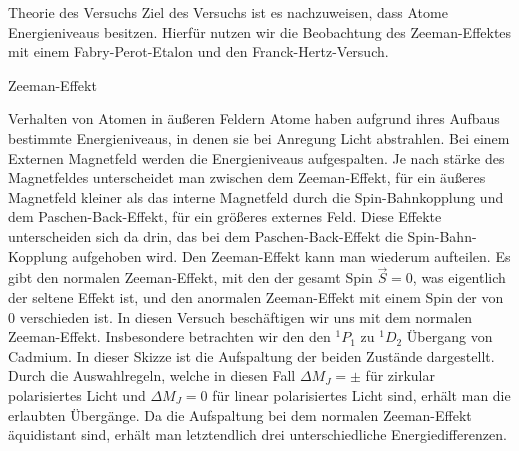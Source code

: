 \documentclass[pdftex, a4paper,11pt, twoside, ngerman]{report}
\begin{document}
  
  
  
  
  
  
  
  
  \tableofcontents
  
  
  
  \begin{chapter}{Theorie des Versuchs}
    \label{chp:Theorie}
    Ziel des Versuchs ist es nachzuweisen, dass Atome Energieniveaus besitzen.
    Hierfür nutzen wir die Beobachtung des Zeeman-Effektes mit einem
    Fabry-Perot-Etalon und den Franck-Hertz-Versuch.
    
    
    \begin{section}{Zeeman-Effekt}
      
      
      
      \begin{subsection}{Verhalten von Atomen in äußeren Feldern}
        Atome haben aufgrund ihres Aufbaus bestimmte Energieniveaus,
        in denen sie bei Anregung Licht abstrahlen. 
        Bei einem Externen Magnetfeld werden die Energieniveaus aufgespalten. 
        Je nach stärke des Magnetfeldes unterscheidet man zwischen dem
        Zeeman-Effekt, für ein äußeres Magnetfeld kleiner als das interne
        Magnetfeld durch die Spin-Bahnkopplung und dem Paschen-Back-Effekt,
        für ein größeres externes Feld. Diese Effekte unterscheiden sich da
        drin, das bei dem Paschen-Back-Effekt die Spin-Bahn-Kopplung aufgehoben
        wird. Den Zeeman-Effekt kann man wiederum aufteilen. Es gibt den
        normalen Zeeman-Effekt, mit den der gesamt Spin $\vec S = 0$, was
        eigentlich der seltene Effekt ist, und den anormalen Zeeman-Effekt mit
        einem Spin der von 0 verschieden ist. \newline
        In diesen Versuch beschäftigen wir uns mit dem normalen Zeeman-Effekt.
        Insbesondere betrachten wir den den ${}^1P_1$ zu ${}^1D_2$ Übergang von
        Cadmium. In dieser Skizze ist die Aufspaltung der beiden Zustände
        dargestellt. Durch die Auswahlregeln, welche in diesen Fall
        $\Delta M_J = \pm$ für zirkular polarisiertes Licht und $\Delta M_J=0$
        für linear polarisiertes Licht sind, erhält man die erlaubten Übergänge.
        Da die Aufspaltung bei dem normalen Zeeman-Effekt äquidistant sind,
        erhält man letztendlich drei unterschiedliche Energiedifferenzen.
        

\end{subsection}
\end{section}
\end{chapter}
\end{document}
